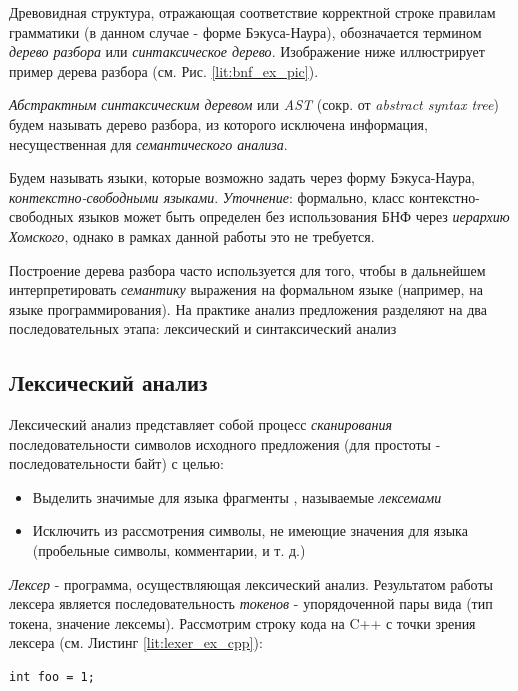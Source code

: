 Древовидная структура, отражающая соответствие корректной строке правилам грамматики (в данном случае - форме Бэкуса-Наура), обозначается термином \textit{дерево разбора} или \textit{синтаксическое дерево}. Изображение ниже иллюстрирует пример дерева разбора (см. Рис. \ref{lit:bnf_ex_pic}). 

\textit{Абстрактным синтаксическим деревом} или \textit{AST} (сокр. от \textit{abstract syntax tree}) будем называть дерево разбора, из которого исключена информация, несущественная для \textit{семантического анализа}.  

Будем называть языки, которые возможно задать через форму Бэкуса-Наура, \textit{контекстно-свободными языками}. \textit{Уточнение}: формально, класс контекстно-свободных языков может быть определен без использования БНФ через \textit{иерархию Хомского}, однако в рамках данной работы это не требуется.

Построение дерева разбора часто используется для того, чтобы в дальнейшем интерпретировать \textit{семантику} выражения на формальном языке (например, на языке программирования). На практике анализ предложения разделяют на два последовательных этапа: лексический и синтаксический анализ

\subsection{Лексический анализ}
Лексический анализ представляет собой процесс \textit{сканирования} последовательности символов исходного предложения (для простоты - последовательности байт) с целью:

\begin{itemize}
    \item Выделить значимые для языка фрагменты , называемые \textit{лексемами}
    \item Исключить из рассмотрения символы, не имеющие значения для языка (пробельные символы, комментарии, и т. д.)
\end{itemize}

\textit{Лексер} - программа, осуществляющая лексический анализ. Результатом работы лексера является последовательность \textit{токенов} - упорядоченной пары вида (тип токена, значение лексемы). Рассмотрим строку кода на C++ с точки зрения лексера (см. Листинг \ref{lit:lexer_ex_cpp}):

\begin{code}
\label{lit:lexer_ex_cpp}
\begin{verbatim}
int foo = 1;
\end{verbatim}
\end{code}

